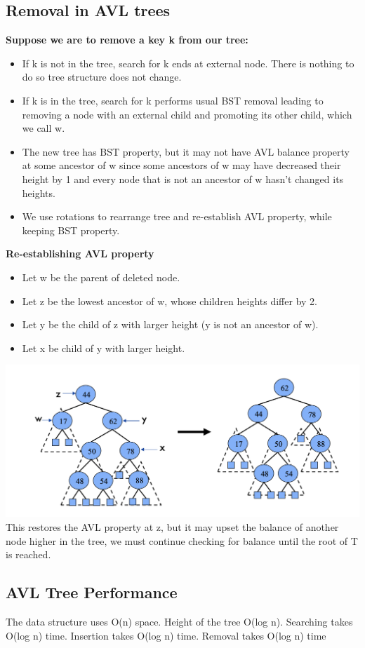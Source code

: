 \documentclass[12pt]{article}
\newcommand{\1}{\space \quad}
\newcommand{\2}{\quad \quad \quad}
\newcommand{\3}{\quad \quad \quad \quad \space}
\newcommand{\4}{\quad \quad \quad \quad \quad \quad}
\begin{document}
\subsection{Removal in AVL trees}
\textbf{Suppose we are to remove a key k from our tree:}
\begin{itemize}
  \item If k is not in the tree, search for k ends at external node. There is nothing to do so tree structure does not change.
  \item If k is in the tree, search for k performs usual BST removal leading to removing a node with an external child and promoting its other child, which we call w.
  \item The new tree has BST property, but it may not have AVL balance property at some ancestor of w since some ancestors of w may have decreased their height by 1 and every node that is not an ancestor of w hasn’t changed its heights.
  \item We use rotations to rearrange tree and re-establish AVL property, while keeping BST property.
\end{itemize}
\textbf{Re-establishing AVL property}
\begin{itemize}
  \item Let w be the parent of deleted node.
  \item Let z be the lowest ancestor of w, whose children heights differ by 2.
  \item Let y be the child of z with larger height (y is not an ancestor of w).
  \item Let x be child of y with larger height.
\end{itemize}
\includegraphics[width=\textwidth]{image9.png}
This restores the AVL property at z, but it may upset the balance of another node higher in the tree, we must continue checking for balance until the root of T is reached.

\subsection{AVL Tree Performance}
The data structure uses O(n) space. Height of the tree O(log n). Searching takes O(log n) time. Insertion takes O(log n) time. Removal takes O(log n) time
\end{document}

